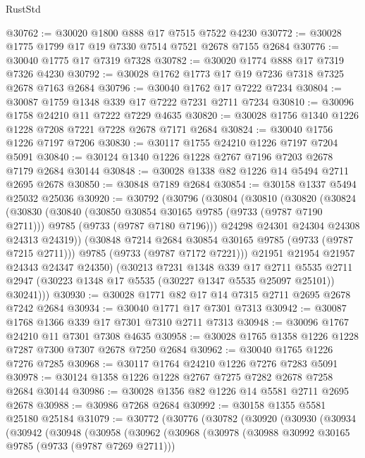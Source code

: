 \begin{lexlean}{RustStd}
\begin{coremodule}
@30762 := @30020 @1800 @888 @17 @7515 @7522 @4230
@30772 := @30028 @1775 @1799 @17 @19 @7330 @7514 @7521 @2678 @7155 @2684
@30776 := @30040 @1775 @17 @7319 @7328
@30782 := @30020 @1774 @888 @17 @7319 @7326 @4230
@30792 := @30028 @1762 @1773 @17 @19 @7236 @7318 @7325 @2678 @7163 @2684
@30796 := @30040 @1762 @17 @7222 @7234
@30804 := @30087 @1759 @1348 @339 @17 @7222 @7231 @2711 @7234
@30810 := @30096 @1758 @24210 @11 @7222 @7229 @4635
@30820 := @30028 @1756 @1340 @1226 @1228 @7208 @7221 @7228 @2678 @7171 @2684
@30824 := @30040 @1756 @1226 @7197 @7206
@30830 := @30117 @1755 @24210 @1226 @7197 @7204 @5091
@30840 := @30124 @1340 @1226 @1228 @2767 @7196 @7203 @2678 @7179 @2684 @30144
@30848 := @30028 @1338 @82 @1226 @14 @5494 @2711 @2695 @2678
@30850 := @30848 @7189 @2684
@30854 := @30158 @1337 @5494 @25032 @25036
@30920 := @30792
    (@30796
      (@30804
        (@30810
          (@30820
            (@30824
              (@30830
                (@30840
                  (@30850 @30854 @30165 @9785 (@9733 (@9787 @7190 @2711)))
                  @9785
                  (@9733 (@9787 @7180 @7196)))
                @24298
                @24301
                @24304
                @24308
                @24313
                @24319))
            (@30848 @7214 @2684 @30854 @30165 @9785 (@9733 (@9787 @7215 @2711)))
            @9785
            (@9733 (@9787 @7172 @7221)))
          @21951
          @21954
          @21957
          @24343
          @24347
          @24350)
        (@30213
          @7231
          @1348
          @339
          @17
          @2711
          @5535
          @2711
          @2947
          (@30223 @1348 @17 @5535 (@30227 @1347 @5535 @25097 @25101))
          @30241)))
@30930 := @30028 @1771 @82 @17 @14 @7315 @2711 @2695 @2678 @7242 @2684
@30934 := @30040 @1771 @17 @7301 @7313
@30942 := @30087 @1768 @1366 @339 @17 @7301 @7310 @2711 @7313
@30948 := @30096 @1767 @24210 @11 @7301 @7308 @4635
@30958 := @30028 @1765 @1358 @1226 @1228 @7287 @7300 @7307 @2678 @7250 @2684
@30962 := @30040 @1765 @1226 @7276 @7285
@30968 := @30117 @1764 @24210 @1226 @7276 @7283 @5091
@30978 := @30124 @1358 @1226 @1228 @2767 @7275 @7282 @2678 @7258 @2684 @30144
@30986 := @30028 @1356 @82 @1226 @14 @5581 @2711 @2695 @2678
@30988 := @30986 @7268 @2684
@30992 := @30158 @1355 @5581 @25180 @25184
@31079 := @30772
    (@30776
      (@30782
        (@30920
          (@30930
            (@30934
              (@30942
                (@30948
                  (@30958
                    (@30962
                      (@30968
                        (@30978
                          (@30988 @30992 @30165 @9785 (@9733 (@9787 @7269 @2711)))

\end{coremodule}
\end{lexlean}
